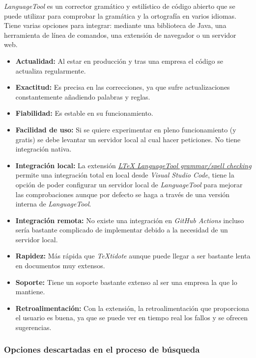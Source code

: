 \textit{LanguageTool} es un corrector gramático y estilístico de código abierto que se puede utilizar para comprobar la gramática y la ortografía en varios idiomas. Tiene varias opciones para integrar: mediante una biblioteca de Java, una herramienta de línea de comandos, una extensión de navegador o un servidor web.

\begin{itemize}
    \item[\bien] \textbf{Actualidad:}  Al estar en producción y tras una empresa el código se actualiza regularmente.
    \item[\bien] \textbf{Exactitud:} Es precisa en las correcciones, ya que sufre actualizaciones constantemente añadiendo palabras y reglas.
    \item[\bien] \textbf{Fiabilidad:} Es estable en su funcionamiento.
    \item[\regular] \textbf{Facilidad de uso:} Si se quiere experimentar en pleno funcionamiento (y gratis) se debe levantar un servidor local al cual hacer peticiones. No tiene integración nativa.
    \item[\esp] \textbf{Integración local:} La extensión \href{https://github.com/valentjn/vscode-ltex}{\textit{LTeX LanguageTool grammar/spell checking}} permite una integración total en local desde \textit{Visual Studio Code}, tiene la opción de poder configurar un servidor local de \textit{LanguageTool} para mejorar las comprobaciones aunque por defecto se haga a través de una versión interna de \textit{LanguageTool}.
    \item[\mal] \textbf{Integración remota:} No existe una integración en \textit{GitHub Actions} incluso sería bastante complicado de implementar debido a la necesidad de un servidor local.
    \item[\regular] \textbf{Rapidez:} Más rápida que \textit{TeXtidote} aunque puede llegar a ser bastante lenta en documentos muy extensos.
    \item[\bien] \textbf{Soporte:} Tiene un soporte bastante extenso al ser una empresa la que lo mantiene.
    \item[\bien] \textbf{Retroalimentación:} Con la extensión, la retroalimentación que proporciona el usuario es buena, ya que se puede ver en tiempo real los fallos y se ofrecen sugerencias.
\end{itemize}

\subsubsection{Opciones descartadas en el proceso de búsqueda}

